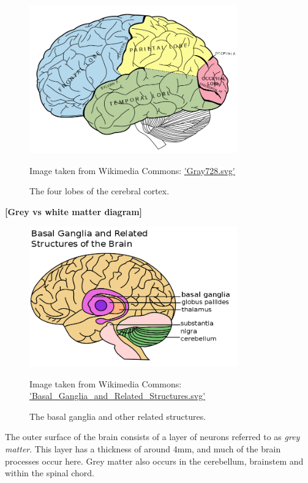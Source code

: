 \begin{figure}[ht]
	\centering
	\includegraphics[width=0.8\textwidth]{Images/2_Lobes_of_the_brain_NL.png}
	\caption{The four lobes of the cerebral cortex.}
	\small Image taken from Wikimedia Commons: \url{'Gray728.svg'}
\end{figure}

\textbf{[Grey vs white matter diagram]}

\begin{figure}[ht]
	\centering
	\includegraphics[width=0.8\textwidth]{Images/2_Basal_Ganglia_and_Related_Structures.png}
	\caption{The basal ganglia and other related structures.}
	\small Image taken from Wikimedia Commons: \url{'Basal_Ganglia_and_Related_Structures.svg'}
\end{figure}


The outer surface of the brain consists of a layer of neurons referred to as \textit{grey matter}. This layer has a thickness of around 4mm, and much of the brain processes occur here. Grey matter also occurs in the cerebellum, brainstem and within the spinal chord.

